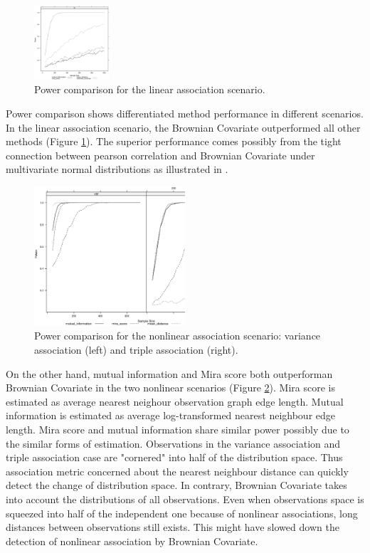 \documentclass{sig-alternate}
\begin{document}
\begin{figure}[h]
  \centering
  \includegraphics[width=0.25\textwidth,height=0.25\textwidth]{../code/numerical-comparison/sim-power-linear.eps}
  \caption{Power comparison for the linear association scenario.}
  \label{fig:result-linear}
\end{figure}

Power comparison shows differentiated method performance in different
scenarios. In the linear association scenario, the Brownian Covariate
outperformed all other methods (Figure \ref{fig:result-linear}). The
superior performance comes possibly from the tight connection between
pearson correlation and Brownian Covariate under multivariate normal
distributions as illustrated in \cite{székely2009}.

\begin{figure}[h]
  \centering
  \includegraphics[width=0.5\textwidth,height=0.25\textwidth]{../code/numerical-comparison/sim-power-nonlinear.eps}
  \caption{Power comparison for the nonlinear association scenario:
    variance association (left) and triple association (right).}
  \label{fig:result-nonlinear}
\end{figure}

On the other hand, mutual information and Mira score both outperforman
Brownian Covariate in the two nonlinear scenarios (Figure
\ref{fig:result-nonlinear}). Mira score is estimated as average
nearest neighour observation graph edge length. Mutual information is
estimated as average log-transformed nearest neighbour edge length.
Mira score and mutual information share similar power possibly due to
the similar forms of estimation. Observations in the variance
association and triple association case are "cornered" into half of
the distribution space. Thus association metric concerned about the
nearest neighbour distance can quickly detect the change of
distribution space. In contrary, Brownian Covariate takes into account
the distributions of all observations. Even when observations space is
squeezed into half of the independent one because of nonlinear
associations, long distances between observations still exists. This
might have slowed down the detection of nonlinear association by
Brownian Covariate. 
\end{document}
